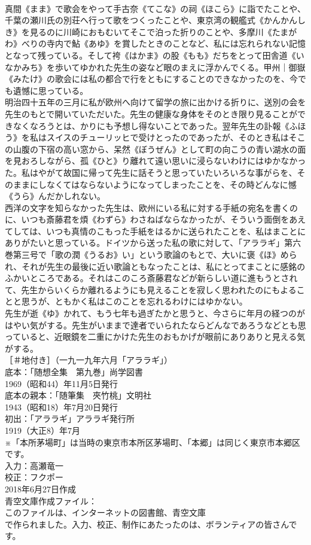 \documentclass[8pt]{extreport}
\begin{document}
\begin{CJK}{UTF8}{min}
\\	真間《まま》で歌会をやって手古奈《てこな》の祠《ほこら》に詣でたことや、千葉の瀬川氏の別荘へ行って歌をつくったことや、東京湾の観艦式《かんかんしき》を見るのに川崎におもむいてそこで泊った折りのことや、多摩川《たまがわ》べりの寺内で鮎《あゆ》を賞したときのことなど、私には忘れられない記憶となって残っている。そして袴《はかま》の股《もも》だちをとって田舎道《いなかみち》を歩いてゆかれた先生の姿など眼のまえに浮かんでくる。甲州｜御嶽《みたけ》の歌会には私の都合で行をともにすることのできなかったのを、今でも遺憾に思っている。
\\	明治四十五年の三月に私が欧州へ向けて留学の旅に出かける折りに、送別の会を先生のもとで開いていただいた。先生の健康な身体をそのとき限り見ることができなくなろうとは、かりにも予想し得ないことであった。翌年先生の訃報《ふほう》を私はスイスのチューリッヒで受けとったのであったが、そのとき私はそこの山腹の下宿の高い窓から、呆然《ぼうぜん》として町の向こうの青い湖水の面を見おろしながら、孤《ひと》り離れて遠い思いに浸らないわけにはゆかなかった。私はやがて故国に帰って先生に話そうと思っていたいろいろな事がらを、そのままにしなくてはならないようになってしまったことを、その時どんなに憾《うら》んだかしれない。
\\	西洋の文字を知らなかった先生は、欧州にいる私に対する手紙の宛名を書くのに、いつも斎藤君を煩《わずら》わさねばならなかったが、そういう面倒をあえてしては、いつも真情のこもった手紙をはるかに送られたことを、私はまことにありがたいと思っている。ドイツから送った私の歌に対して、「アララギ」第六巻第三号で「歌の潤《うるお》い」という歌論のもとで、大いに褒《ほ》められ、それが先生の最後に近い歌論ともなったことは、私にとってまことに感銘のふかいところである。それはこのころ斎藤君などが新らしい道に進もうとされて、先生からいくらか離れるようにも見えることを寂しく思われたのにもよることと思うが、ともかく私はこのことを忘れるわけにはゆかない。
\\	先生が逝《ゆ》かれて、もう七年も過ぎたかと思うと、今さらに年月の経つのがはやい気がする。先生がいままで達者でいられたならどんなであろうなどとも思っていると、近眼鏡を二重にかけた先生のおもかげが眼前にありありと見える気がする。
\\	［＃地付き］（一九一九年六月「アララギ」）
\\	底本：「随想全集　第九巻」尚学図書
\\	1969（昭和44）年11月5日発行
\\	底本の親本：「随筆集　夾竹桃」文明社
\\	1943（昭和18）年7月20日発行
\\	初出：「アララギ」アララギ発行所
\\	1919（大正8）年7月
\\	※「本所茅場町」は当時の東京市本所区茅場町、「本郷」は同じく東京市本郷区です。
\\	入力：高瀬竜一
\\	校正：フクポー
\\	2018年6月27日作成
\\	青空文庫作成ファイル：
\\	このファイルは、インターネットの図書館、青空文庫
\\	で作られました。入力、校正、制作にあたったのは、ボランティアの皆さんです。
\end{CJK}
\end{document}
